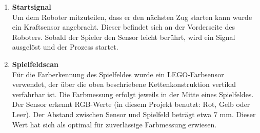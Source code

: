 \begin{enumerate}
	\item \textbf{Startsignal}\\
	Um dem Roboter mitzuteilen, dass er den nächsten Zug starten kann wurde ein Kraftsensor angebracht. Dieser befindet sich an der Vorderseite des Roboters. Sobald der Spieler den Sensor leicht berührt, wird ein Signal ausgelöst und der Prozess startet. 
	\item \textbf{Spielfeldscan }\\
	 Für die Farberkennung des Spielfeldes wurde ein LEGO-Farbsensor verwendet, der über die oben beschriebene Kettenkonstruktion vertikal verfahrbar ist. Die Farbmessung erfolgt jeweils in der Mitte eines Spielfeldes. Der Sensor erkennt RGB-Werte (in diesem Projekt benutzt: Rot, Gelb oder Leer). Der Abstand zwischen Sensor und Spielfeld beträgt etwa 7 mm. Dieser Wert hat sich als optimal für zuverlässige Farbmessung erwiesen.
\end{enumerate}


